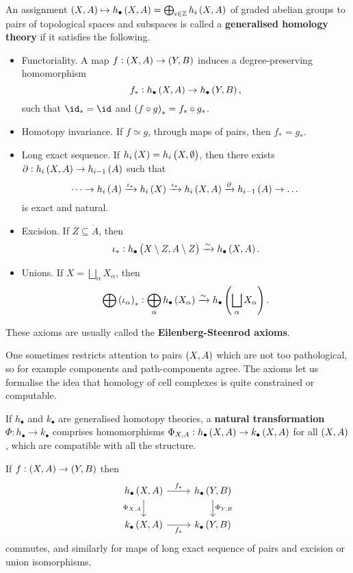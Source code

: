 \begin{definition*}
An assignment $ \br{X, A} \mapsto h_\bullet\br{X, A} = \bigoplus_{i \in \ZZ} h_i\br{X, A} $ of graded abelian groups to pairs of topological spaces and subspaces is called a \textbf{generalised homology theory} if it satisfies the following.
\begin{itemize}
\item Functoriality. A map $ f : \br{X, A} \to \br{Y, B} $ induces a degree-preserving homomorphism
$$ f_* : h_\bullet\br{X, A} \to h_\bullet\br{Y, B}, $$
such that $ \id_* = \id $ and $ \br{f \circ g}_* = f_* \circ g_* $.
\item Homotopy invariance. If $ f \simeq g $, through maps of pairs, then $ f_* = g_* $.
\item Long exact sequence. If $ h_i\br{X} = h_i\br{X, \emptyset} $, then there exists $ \da : h_i\br{X, A} \to h_{i - 1}\br{A} $ such that
$$ \dots \to h_i\br{A} \xrightarrow{\iota_*} h_i\br{X} \xrightarrow{\iota_*} h_i\br{X, A} \xrightarrow{\da} h_{i - 1}\br{A} \to \dots $$
is exact and natural.
\item Excision. If $ \overline{Z} \subseteq \mathring{A} $, then
$$ \iota_* : h_\bullet\br{X \setminus Z, A \setminus Z} \xrightarrow{\sim} h_\bullet\br{X, A}. $$
\item Unions. If $ X = \bigsqcup_\alpha X_\alpha $, then
$$ \bigoplus \br{\iota_\alpha}_* : \bigoplus_\alpha h_\bullet\br{X_\alpha} \xrightarrow{\sim} h_\bullet\br{\bigsqcup_\alpha X_\alpha}. $$
\end{itemize}
These axioms are usually called the \textbf{Eilenberg-Steenrod axioms}.
\end{definition*}

One sometimes restricts attention to pairs $ \br{X, A} $ which are not too pathological, so for example components and path-components agree. The axioms let us formalise the idea that homology of cell complexes is quite constrained or computable.

\begin{definition*}
If $ h_\bullet $ and $ k_\bullet $ are generalised homotopy theories, a \textbf{natural transformation} $ \Phi : h_\bullet \to k_\bullet $ comprises homomorphisms $ \Phi_{X, A} : h_\bullet\br{X, A} \to k_\bullet\br{X, A} $ for all $ \br{X, A} $, which are compatible with all the structure.
\end{definition*}

\begin{example*}
If $ f : \br{X, A} \to \br{Y, B} $ then
$$
\begin{tikzcd}
h_\bullet\br{X, A} \arrow{r}{f_*} \arrow{d}[swap]{\Phi_{X, A}} & h_\bullet\br{Y, B} \arrow{d}{\Phi_{Y, B}} \\
k_\bullet\br{X, A} \arrow{r}[swap]{f_*} & k_\bullet\br{Y, B}
\end{tikzcd}
$$
commutes, and similarly for maps of long exact sequence of pairs and excision or union isomorphisms.
\end{example*}

